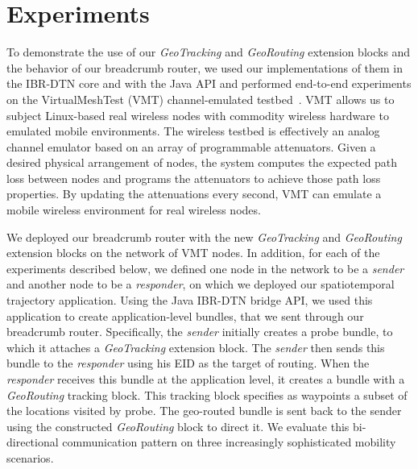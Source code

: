 \section{Experiments}\label{sec:experiments}
To demonstrate the use of our {\em GeoTracking} and {\em GeoRouting}
extension blocks and the behavior of our {\sc breadcrumb} router, we
used our implementations of them in the IBR-DTN core and with the Java
API and performed end-to-end experiments on the VirtualMeshTest (VMT)
channel-emulated testbed~\cite{hahn10:using, kim11:reality}.  VMT
allows us to subject Linux-based real wireless nodes with commodity
wireless hardware to emulated mobile environments.  The wireless
testbed is effectively an analog channel emulator based on an array of
programmable attenuators.  Given a desired physical arrangement of
nodes, the system computes the expected path loss between nodes and
programs the attenuators to achieve those path loss properties.  By
updating the attenuations every second, VMT can emulate a mobile
wireless environment for real wireless nodes.

We deployed our {\sc breadcrumb} router with the new {\em GeoTracking}
and {\em GeoRouting} extension blocks on the network of VMT nodes. In
addition, for each of the experiments described below, we defined one
node in the network to be a {\em sender} and another node to be a {\em
  responder}, on which we deployed our spatiotemporal trajectory
application. Using the Java IBR-DTN bridge API, we used this
application to create application-level bundles, that we sent through
our {\sc breadcrumb} router. Specifically, the {\em sender} initially
creates a probe bundle, to which it attaches a {\em GeoTracking}
extension block. The {\em sender} then sends this bundle to the {\em
  responder} using his EID as the target of routing. When the {\em
  responder} receives this bundle at the application level, it creates
a bundle with a {\em GeoRouting} tracking block. This tracking block
specifies as waypoints a subset of the locations visited by probe. The
geo-routed bundle is sent back to the sender using the constructed
{\em GeoRouting} block to direct it. We evaluate this bi-directional
communication pattern on three increasingly sophisticated mobility
scenarios.

